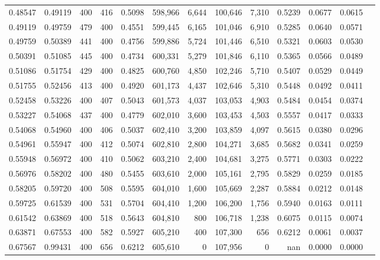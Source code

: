 \begin{tabular}{rrrrrrrrrrrrr}
0.48547 & 0.49119 &    400 & 416 &                                     0.5098 & 598,966 &   6,644 & 100,646 &   7,310 & 0.5239 & 0.0677 & 0.0615 \\
0.49119 & 0.49759 &    479 & 400 &                                     0.4551 & 599,445 &   6,165 & 101,046 &   6,910 & 0.5285 & 0.0640 & 0.0571 \\
0.49759 & 0.50389 &    441 & 400 &                                     0.4756 & 599,886 &   5,724 & 101,446 &   6,510 & 0.5321 & 0.0603 & 0.0530 \\
0.50391 & 0.51085 &    445 & 400 &                                     0.4734 & 600,331 &   5,279 & 101,846 &   6,110 & 0.5365 & 0.0566 & 0.0489 \\
0.51086 & 0.51754 &    429 & 400 &                                     0.4825 & 600,760 &   4,850 & 102,246 &   5,710 & 0.5407 & 0.0529 & 0.0449 \\
0.51755 & 0.52456 &    413 & 400 &                                     0.4920 & 601,173 &   4,437 & 102,646 &   5,310 & 0.5448 & 0.0492 & 0.0411 \\
0.52458 & 0.53226 &    400 & 407 &                                     0.5043 & 601,573 &   4,037 & 103,053 &   4,903 & 0.5484 & 0.0454 & 0.0374 \\
0.53227 & 0.54068 &    437 & 400 &                                     0.4779 & 602,010 &   3,600 & 103,453 &   4,503 & 0.5557 & 0.0417 & 0.0333 \\
0.54068 & 0.54960 &    400 & 406 &                                     0.5037 & 602,410 &   3,200 & 103,859 &   4,097 & 0.5615 & 0.0380 & 0.0296 \\
0.54961 & 0.55947 &    400 & 412 &                                     0.5074 & 602,810 &   2,800 & 104,271 &   3,685 & 0.5682 & 0.0341 & 0.0259 \\
0.55948 & 0.56972 &    400 & 410 &                                     0.5062 & 603,210 &   2,400 & 104,681 &   3,275 & 0.5771 & 0.0303 & 0.0222 \\
0.56976 & 0.58202 &    400 & 480 &                                     0.5455 & 603,610 &   2,000 & 105,161 &   2,795 & 0.5829 & 0.0259 & 0.0185 \\
0.58205 & 0.59720 &    400 & 508 &                                     0.5595 & 604,010 &   1,600 & 105,669 &   2,287 & 0.5884 & 0.0212 & 0.0148 \\
0.59725 & 0.61539 &    400 & 531 &                                     0.5704 & 604,410 &   1,200 & 106,200 &   1,756 & 0.5940 & 0.0163 & 0.0111 \\
0.61542 & 0.63869 &    400 & 518 &                                     0.5643 & 604,810 &     800 & 106,718 &   1,238 & 0.6075 & 0.0115 & 0.0074 \\
0.63871 & 0.67553 &    400 & 582 &                                     0.5927 & 605,210 &     400 & 107,300 &     656 & 0.6212 & 0.0061 & 0.0037 \\
0.67567 & 0.99431 &    400 & 656 &                                     0.6212 & 605,610 &       0 & 107,956 &       0 &    nan & 0.0000 & 0.0000 \\
\bottomrule
\end{tabular}
